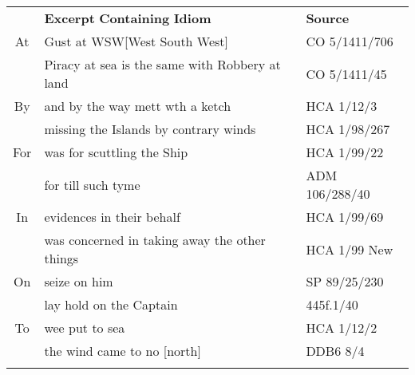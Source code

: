 \tabletail{}
\tablelasttail{}
\begin{tabularx}{\textwidth}{XXX}

\lsptoprule

\multicolumn{1}{c}{\textbf{Preposition}} & \textbf{Excerpt} \textbf{Containing} \textbf{Idiom} & \textbf{Source}\\
\multicolumn{1}{c}{At} & Gust at WSW[West South West] & CO 5/1411/706\\
& Piracy at sea is the same with Robbery at land & CO 5/1411/45\\
\multicolumn{1}{c}{By} & and by the way mett wth a ketch\footnotemark{} & HCA 1/12/3\\
& missing the Islands by contrary winds & HCA 1/98/267\\
\multicolumn{1}{c}{For} & was for scuttling the Ship & HCA 1/99/22\\
& for till such tyme & ADM 106/288/40\\
\multicolumn{1}{c}{In} & evidences in their behalf & HCA 1/99/69\\
& was concerned in taking away the other things & HCA 1/99 New \citealt{Providence1722}\\
\multicolumn{1}{c}{On} & seize on him & SP 89/25/230\\
& lay hold on the Captain & 445f.1/40\\
\multicolumn{1}{c}{To} & wee put to sea\footnotemark{} & HCA 1/12/2 \\
& the wind came to no [north] & DDB6 8/4\\
\lspbottomrule
\end{tabularx}
